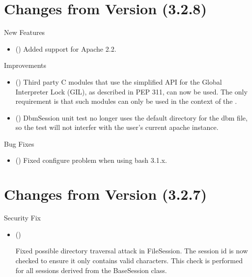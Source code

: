 \chapter{Changes from Version (3.2.8)\label{app-changes}}


  New Features

  \begin{itemize}
    \item
      ()
      Added support for Apache 2.2.
  \end{itemize}

  Improvements

  \begin{itemize}
    \item
      ()
      Third party C modules that use the simplified API for the Global
      Interpreter Lock (GIL), as described in PEP 311, can now be used. The
      only requirement is that such modules can only be used in the context
      of the .
    \item
      ()
      DbmSession unit test no longer uses the default directory for the dbm file,
      so the test will not interfer with the user's current apache instance.
  \end{itemize}

  Bug Fixes

  \begin{itemize}
    \item
      ()
      Fixed configure problem when using bash 3.1.x.
  \end{itemize}
   
\chapter{Changes from Version (3.2.7)\label{app-changes}}


  Security Fix 

  \begin{itemize}
    \item
    ()

    Fixed possible directory traversal attack in FileSession. The session
    id is now checked to ensure it only contains valid characters. This
    check is performed for all sessions derived from the BaseSession 
    class. 
  \end{itemize}
 
